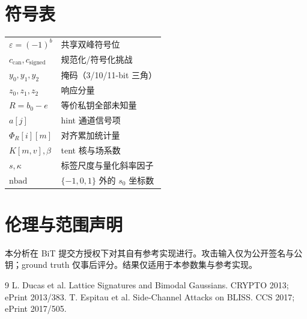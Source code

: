 \documentclass[11pt,a4paper]{ctexart}
\begin{document}
\appendix

\section{符号表}

\begin{tabular}{@{}lp{11.5cm}@{}}
\toprule
$\varepsilon=(-1)^b$ & 共享双峰符号位 \\
$c_{\mathrm{can}},c_{\mathrm{signed}}$ & 规范化/符号化挑战 \\
$y_0,y_1,y_2$ & 掩码（3/10/11-bit 三角） \\
$z_0,z_1,z_2$ & 响应分量 \\
$R=b_0-e$ & 等价私钥全部未知量 \\
$a[j]$ & hint 通道信号项 \\
$\Phi_R[i][m]$ & 对齐累加统计量 \\
$K[m,v],\beta$ & tent 核与场系数 \\
$s,\kappa$ & 标签尺度与量化斜率因子 \\
$\mathrm{nbad}$ & $\{-1,0,1\}$ 外的 $s_0$ 坐标数 \\
\bottomrule
\end{tabular}

\section{伦理与范围声明}

本分析在 BiT 提交方授权下对其自有参考实现进行。攻击输入仅为公开签名与公钥；ground truth 仅事后评分。结果仅适用于本参数集与参考实现。

\begin{thebibliography}{9}
 L. Ducas et al. Lattice Signatures and Bimodal Gaussians. CRYPTO 2013; ePrint 2013/383.
 T. Espitau et al. Side-Channel Attacks on BLISS. CCS 2017; ePrint 2017/505.
\end{thebibliography}
\end{document}
